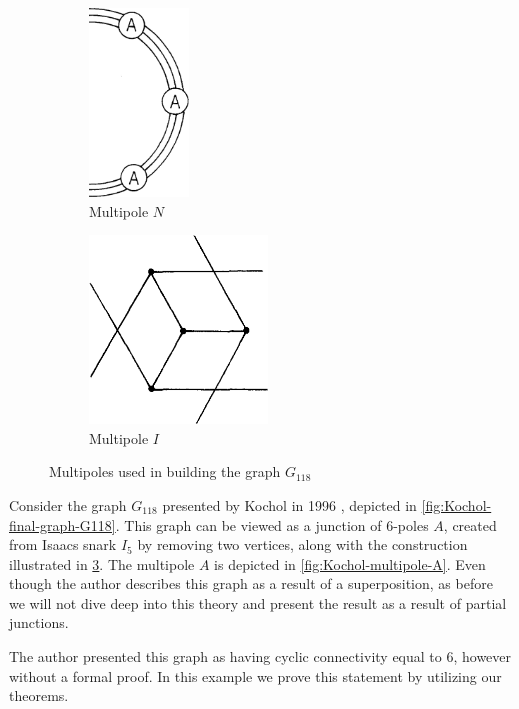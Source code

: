 \documentclass[12pt, twoside]{book}
\begin{document}
\begin{example}
	\begin{figure}
		\centering
		\begin{subfigure}[b]{0.45\textwidth}
			\centering
			\includegraphics[height=5cm, width=\textwidth, keepaspectratio]{images/Kochol-article/Kochol-building-multipole}
			\caption{Multipole $N$}
			\label{fig:Kochol-first-multipole}
		\end{subfigure}
		\hfill
		\begin{subfigure}[b]{0.45\textwidth}
			\centering
			\includegraphics[height=5cm, width=\textwidth, keepaspectratio]{images/Kochol-article/Kochol-inner-multipole}
			\caption{Multipole $I$}
			\label{fig:Kochol-inner-multipole}
		\end{subfigure}
		\caption{Multipoles used in building the graph $G_{118}$}
	\end{figure}
	
	Consider the graph $G_{118}$ presented by Kochol in 1996 \cite{Kochol1996}, depicted in \cref{fig:Kochol-final-graph-G118}. This graph can be viewed as a junction of 6-poles $A$, created from Isaacs snark $I_5$ \cite{Isaacs1975} by removing two vertices, along with the construction illustrated in \cref{fig:Kochol-inner-multipole}. The multipole $A$ is depicted in \cref{fig:Kochol-multipole-A}. Even though the author describes this graph as a result of a superposition, as before we will not dive deep into this theory and present the result as a result of partial junctions.
	
	The author presented this graph as having cyclic connectivity equal to 6, however without a formal proof. In this example we prove this statement by utilizing our theorems.
	

\end{example}
\end{document}
